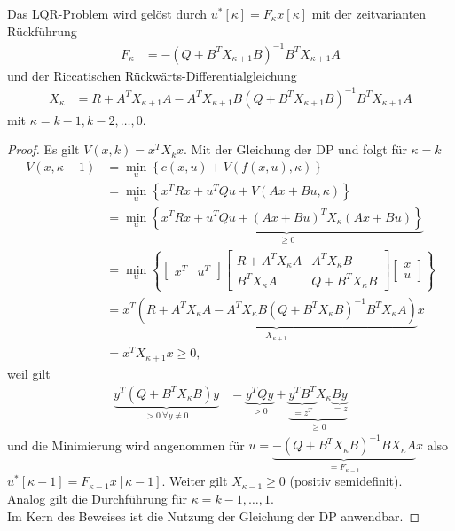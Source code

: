 \begin{satz}
Das \ac{LQR}-Problem wird gelöst durch $u^{\ast}[\kappa]=F_{\kappa}x[\kappa]$ mit der zeitvarianten Rückführung 
\begin{align*}
	F_{\kappa} & = -\left(Q + B^TX_{\kappa + 1}B \right)^{-1}B^TX_{\kappa + 1}A
\end{align*}
und der Riccatischen Rückwärts-Differentialgleichung
\begin{align}
	X_{\kappa} & = R + A^TX_{\kappa + 1}A-A^TX_{\kappa + 1} B\left(Q+B^TX_{\kappa + 1}B \right)^{-1}B^TX_{\kappa + 1} A 
\end{align}
mit $\kappa = k-1, k-2,\ldots,0$.
\end{satz}
\begin{proof}
	Es gilt $V(x,k)=x^TX_kx$. Mit der Gleichung der \ac{DP} und  folgt für $\kappa = k$
	\begin{align*}
		V(x,\kappa - 1) & = \min\limits_u\left\{c(x,u)+V\left(f(x,u),\kappa \right) \right\}\\
		& = \min\limits_u\left\{x^TRx + u^TQu + V\left(Ax + Bu, \kappa \right) \right\}\\
		& = \min\limits_u\underbrace{\left\{x^TRx + u^TQu + (Ax+Bu)^TX_{\kappa}(Ax+Bu) \right\}}_{\geq 0}\\
		& = \min\limits_u\left\{\begin{bmatrix}
		x^T & u^T
		\end{bmatrix}\begin{bmatrix}
		R+A^TX_{\kappa}A	& A^TX_{\kappa} B\\
		B^TX_{\kappa} A		& Q+B^TX_{\kappa}B
		\end{bmatrix}\begin{bmatrix}
		x\\ u
		\end{bmatrix} \right\}\\
		& = x^T\underbrace{\left(R+A^TX_{\kappa}A - A^TX_{\kappa}B\left(Q+B^TX_{\kappa}B \right)^{-1}B^TX_{\kappa}A \right)}_{X_{\kappa +1}}x\\
		& = x^TX_{\kappa +1}x \geq 0,
	\end{align*}
	weil gilt
	\begin{align*}
		\underbrace{y^T\left(Q+B^TX_{\kappa}B \right)y}_{> 0\ \forall y\neq 0} & =
		\underbrace{y^TQy}_{>0}+\underbrace{\underbrace{y^TB^T}_{=z^T}X_{\kappa}\underbrace{By}_{=z} }_{\geq 0}
	\end{align*}
	und die Minimierung wird angenommen für $u = \underbrace{-\left(Q+B^TX_{\kappa}B \right)^{-1}BX_{\kappa}A}_{=F_{\kappa - 1}}x$ also
	$u^{\ast}[\kappa - 1]=F_{\kappa - 1}x[\kappa - 1]$. Weiter gilt $X_{\kappa - 1}\geq 0$ (positiv semidefinit).\\
	Analog gilt die Durchführung für $\kappa=k-1,\ldots,1$.\\
	Im Kern des Beweises ist die Nutzung der Gleichung der \ac{DP} anwendbar.
\end{proof}
